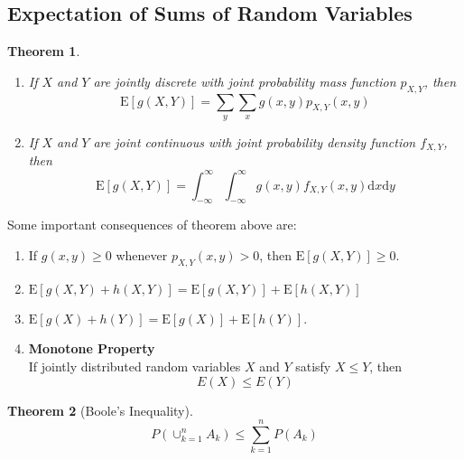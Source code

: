 \documentclass[12pt]{article}
\newcommand{\diff}{\mathrm{d}}
\newcommand{\expec}{\mathrm{E}}
\newtheorem{theorem}{Theorem}[section]
\theoremstyle{definition}
\begin{document}
\subsection{Expectation of Sums of Random Variables}
\begin{theorem}\hfill\\\normalfont
\begin{enumerate}
\item If $X$ and $Y$ are jointly discrete with joint probability mass function $p_{X,Y}$, then
\[
\expec[g(X,Y)] = \sum_{y}\sum_{x}g(x,y)p_{X,Y}(x,y)
\]
\item If $X$ and $Y$ are joint continuous with joint probability density function $f_{X,Y}$, then
\[
\expec[g(X,Y)]=\int_{-\infty}^\infty\int_{-\infty}^\infty g(x,y)f_{X,Y}(x,y)\diff x\diff y
\]
\end{enumerate}
\end{theorem}
Some important consequences of theorem above are:
\begin{enumerate}
\item If $g(x,y)\geq 0$ whenever $p_{X,Y}(x,y)>0$, then $\expec[g(X,Y)]\geq 0$.
\item $\expec[g(X,Y)+h(X,Y)]=\expec[g(X,Y)]+\expec[h(X,Y)]$
\item $\expec[g(X)+h(Y)]=\expec[g(X)]+\expec[h(Y)]$.
\item \textbf{Monotone Property}\\If jointly distributed random variables $X$ and $Y$ satisfy $X\leq Y$, then
\[
E(X)\leq E(Y)
\]
\end{enumerate}
\begin{theorem}[Boole's Inequality]
\[
P(\cup_{k=1}^nA_k)\leq \sum_{k=1}^n P(A_k)
\]
\end{theorem}
\end{document}
